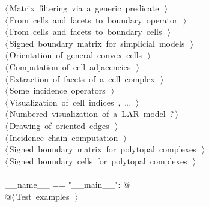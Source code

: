 \documentclass[11pt,oneside]{article}	%
\begin{document}
\begin{flushleft}
\begin{minipage}{\linewidth}
\begin{list}{}{}
\mbox{}\verb@@\hbox{$\langle\,$Matrix filtering via a generic predicate\nobreak\ {\footnotesize {}}$\,\rangle$}\verb@@\\
\mbox{}\verb@@\hbox{$\langle\,$From cells and facets to boundary operator\nobreak\ {\footnotesize {}}$\,\rangle$}\verb@@\\
\mbox{}\verb@@\hbox{$\langle\,$From cells and facets to boundary cells\nobreak\ {\footnotesize {}}$\,\rangle$}\verb@@\\
\mbox{}\verb@@\hbox{$\langle\,$Signed boundary matrix for simplicial models\nobreak\ {\footnotesize {}}$\,\rangle$}\verb@@\\
\mbox{}\verb@@\hbox{$\langle\,$Orientation of general convex cells\nobreak\ {\footnotesize {}}$\,\rangle$}\verb@@\\
\mbox{}\verb@@\hbox{$\langle\,$Computation of cell adjacencies\nobreak\ {\footnotesize {}}$\,\rangle$}\verb@@\\
\mbox{}\verb@@\hbox{$\langle\,$Extraction of facets of a cell complex\nobreak\ {\footnotesize {}}$\,\rangle$}\verb@@\\
\mbox{}\verb@@\hbox{$\langle\,$Some incidence operators\nobreak\ {\footnotesize {}}$\,\rangle$}\verb@@\\
\mbox{}\verb@@\hbox{$\langle\,$Visualization of cell indices\nobreak\ {\footnotesize {}, \ldots\ }$\,\rangle$}\verb@@\\
\mbox{}\verb@@\hbox{$\langle\,$Numbered visualization of a LAR model\nobreak\ {\footnotesize ?}$\,\rangle$}\verb@@\\
\mbox{}\verb@@\hbox{$\langle\,$Drawing of oriented edges\nobreak\ {\footnotesize {}}$\,\rangle$}\verb@@\\
\mbox{}\verb@@\hbox{$\langle\,$Incidence chain computation\nobreak\ {\footnotesize {}}$\,\rangle$}\verb@@\\
\mbox{}\verb@@\hbox{$\langle\,$Signed boundary matrix for polytopal complexes\nobreak\ {\footnotesize {}}$\,\rangle$}\verb@@\\
\mbox{}\verb@@\hbox{$\langle\,$Signed boundary cells for polytopal complexes\nobreak\ {\footnotesize {}}$\,\rangle$}\verb@@\\
\mbox{}\verb@@\\
\mbox{}\verb@if __name__ == "__main__": @\\
\mbox{}\verb@   @\hbox{$\langle\,$Test examples\nobreak\ {\footnotesize {}}$\,\rangle$}\verb@@\\
\mbox{}\verb@@{\NWsep}
\end{list}
\vspace{-2ex}
\end{minipage}\\[4ex]
\end{flushleft}
\end{document}
